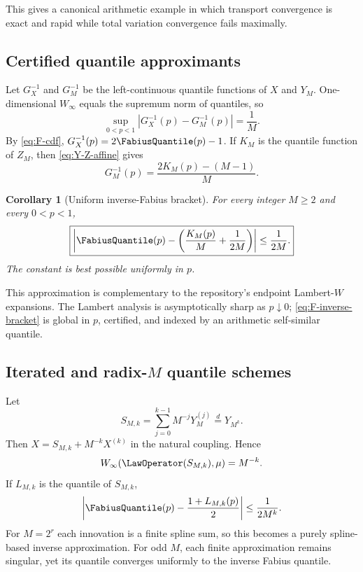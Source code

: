 \documentclass[11pt,oneside]{article}
\newtheorem{corollary}[theorem]{Corollary}
\theoremstyle{definition}
\theoremstyle{remark}
\begin{document}
This gives a canonical arithmetic example in which transport convergence is exact and
rapid while total variation convergence fails maximally.

\subsection{Certified quantile approximants}

Let $G_X^{-1}$ and $G_M^{-1}$ be the left-continuous quantile functions of $X$ and $Y_M$.
One-dimensional $W_\infty$ equals the supremum norm of quantiles, so
\begin{equation}
 \sup_{0<p<1}|G_X^{-1}(p)-G_M^{-1}(p)|=\frac1M.
 \label{eq:quantile-W}
\end{equation}
By \eqref{eq:F-cdf},
$G_X^{-1}(p)=2\FabiusQuantile(p)-1$.  If $K_M$ is the quantile function of
$Z_M$, then \eqref{eq:Y-Z-affine} gives
\[
 G_M^{-1}(p)=\frac{2K_M(p)-(M-1)}{M}.
\]

\begin{corollary}[Uniform inverse-Fabius bracket]
\label{cor:inverse-bracket}
For every integer $M\ge2$ and every $0<p<1$,
\begin{equation}
 \boxed{
 \left|\FabiusQuantile(p)-\left(\frac{K_M(p)}{M}+\frac1{2M}\right)\right|
 \le\frac1{2M}.}
 \label{eq:F-inverse-bracket}
\end{equation}
The constant is best possible uniformly in $p$.
\end{corollary}

This approximation is complementary to the repository's endpoint Lambert-$W$ expansions.
The Lambert analysis is asymptotically sharp as $p\downarrow0$; \eqref{eq:F-inverse-bracket}
is global in $p$, certified, and indexed by an arithmetic self-similar quantile.

\subsection{Iterated and radix-$M$ quantile schemes}

Let
\begin{equation}
 S_{M,k}=\sum_{j=0}^{k-1}M^{-j}Y_M^{(j)}\overset d=Y_{M^k}.
 \label{eq:SMk}
\end{equation}
Then $X=S_{M,k}+M^{-k}X^{(k)}$ in the natural coupling.  Hence
\begin{equation}
 W_\infty(\LawOperator(S_{M,k}),\mu)=M^{-k}.
 \label{eq:iter-W}
\end{equation}
If $L_{M,k}$ is the quantile of $S_{M,k}$,
\begin{equation}
 \left|\FabiusQuantile(p)-\frac{1+L_{M,k}(p)}2\right|
 \le\frac1{2M^k}.
 \label{eq:iter-inverse}
\end{equation}
For $M=2^r$ each innovation is a finite spline sum, so this becomes a purely spline-based
inverse approximation.  For odd $M$, each finite approximation remains singular, yet its
quantile converges uniformly to the inverse Fabius quantile.
\end{document}
